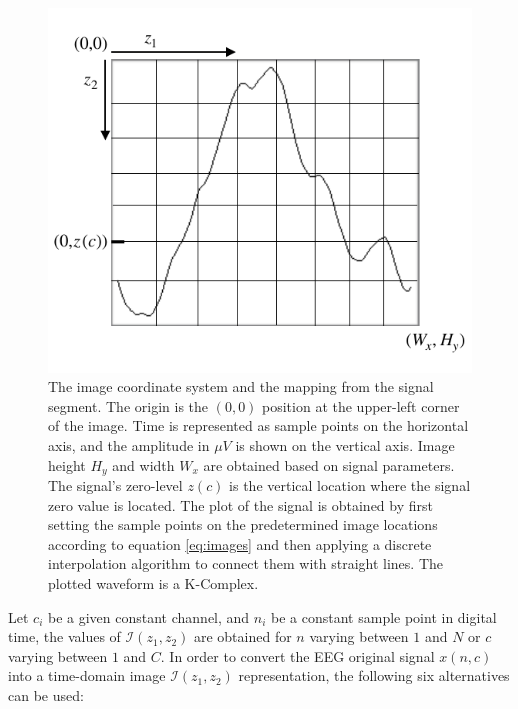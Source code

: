 \begin{figure}[h!]
\centering
\includegraphics[scale=1.2]{images/imagecoordinatesystem.pdf}
\caption[Image Coordinate System]{The image coordinate system and the mapping from the signal segment.  The origin is the $(0,0)$ position at the upper-left corner of the image.  Time is represented as sample points on the horizontal axis, and the amplitude in $\mu V$ is shown on the vertical axis. Image height $H_y$ and width $W_x$ are obtained based on signal parameters.  The signal's zero-level $z(c)$ is the vertical location where the signal zero value is located. The plot of the signal is obtained by first setting the sample points on the predetermined image locations according to equation \ref{eq:images} and then applying a discrete interpolation algorithm to connect them with straight lines. The plotted waveform is a K-Complex.}
\label{fig:imagecoordinatesystem}
\end{figure}


Let $c_i$ be a given constant channel, and $n_i$ be a constant sample point in digital time,  the values of $\mathcal{I}(z_1,z_2)$ are obtained for $n$ varying between $1$ and $N$ or $c$ varying between $1$ and $C$.   In order to convert the EEG original signal $x(n,c)$ into a time-domain image $\mathcal{I}(z_1,z_2)$ representation, the following six alternatives can be used:

